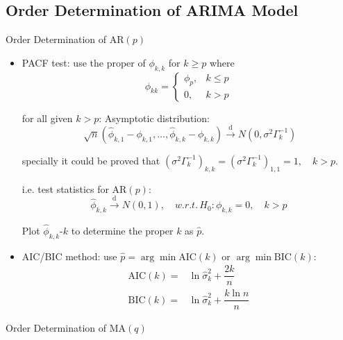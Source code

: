 \subsection{Order Determination of ARIMA Model}
\begin{point}
    Order Determination of AR$ (p) $
\end{point}
\begin{itemize}[topsep=2pt,itemsep=0pt]
    \item PACF test: use the proper of $ \phi _{k,k} $ for $ k\geq p $ where  
    \begin{equation}
        \phi _{kk}=\begin{cases}
            \phi _p,&k\leq p\\
            0,&k>p
        \end{cases} 
    \end{equation}

    for all given $ k> p $: Asymptotic distribution:
    \begin{equation}
        \sqrt[]{n}(\hat{\phi }_{k,1}-\phi _{k,1},\ldots, \hat{\phi }_{k,k}-\phi _{k,k})\xrightarrow[]{\mathrm{d}} N(0,\sigma ^2\Gamma _k^{-1}) 
    \end{equation}

    specially it could be proved that $ \left(\sigma ^2\Gamma ^{-1}_{k}\right)_{k,k}=\left(\sigma ^2\Gamma ^{-1}_{k}\right)_{1,1}=1,\quad k>p $.
    
    i.e. test statistics for AR$ (p) $:
    \begin{equation}
        \hat{\phi }_{k,k}\xrightarrow[]{\mathrm{d}}  N(0,1),\quad w.r.t.\, H_0:\phi _{k,k}=0 ,\quad k>p
    \end{equation}
    
    Plot $ \hat{\phi }_{k,k} $-$ k $ to determine the proper $ k $ as $ \hat{p} $.
    \item AIC/BIC method: use $\hat{p}= \arg\min \mathrm{AIC}(k)  $ or $ \arg\min\mathrm{BIC}(k)  $:
    \begin{align}
        \mathrm{AIC}(k)=&\ln \hat{\sigma }_k^2+\dfrac{2k}{n}\\
        \mathrm{BIC}(k)=&\ln \hat{\sigma }_k^2+\dfrac{k\ln n}{n}
    \end{align}
\end{itemize}


\begin{point}
    Order Determination of MA$ (q) $
\end{point}

